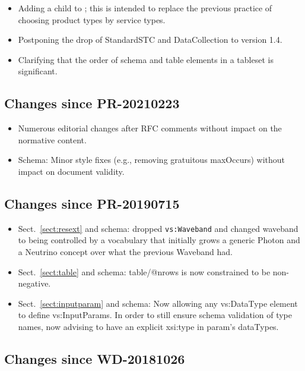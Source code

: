 \documentclass[11pt,a4paper]{ivoa}
\begin{document}
\begin{itemize}
\item Adding a  child to ;
this is intended to replace the previous practice of choosing product
types by service types.
\item Postponing the drop of StandardSTC and DataCollection to version
1.4.
\item Clarifying that the order of schema and table elements in a
tableset is significant.
\end{itemize}

\subsection{Changes since PR-20210223}

\begin{itemize}
\item Numerous editorial changes after RFC comments without
impact on the normative content.
\item Schema: Minor style fixes (e.g., removing gratuitous maxOccurs)
without impact on document validity.
\end{itemize}

\subsection{Changes since PR-20190715}

\begin{itemize}
\item Sect.~\ref{sect:resext} and schema:
dropped \verb|vs:Waveband| and changed waveband to being
controlled by a vocabulary that initially grows a generic Photon and a
Neutrino concept over what the previous Waveband had.
\item Sect.~\ref{sect:table} and schema: table/@nrows is now constrained to be non-negative.
\item Sect.~\ref{sect:inputparam} and schema:
Now allowing any vs:DataType element to define vs:InputParams.
In order to still ensure schema validation of type names,
now advising to have an explicit xsi:type in param's dataTypes.
\end{itemize}

\subsection{Changes since  WD-20181026}
\end{document}
